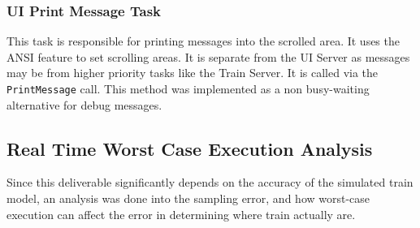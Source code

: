 \documentclass[letterpaper]{article}
\begin{document}
\subsubsection{UI Print Message Task%
  \label{ui-print-message-task}%
}

This task is responsible for printing messages into the scrolled area. It uses the ANSI feature to set scrolling areas. It is separate from the UI Server as messages may be from higher priority tasks like the Train Server. It is called via the \texttt{PrintMessage} call.  This method was implemented as a non busy-waiting alternative for debug messages.


\subsection{Real Time Worst Case Execution Analysis%
  \label{real-time-worst-case-execution-analysis}%
}

Since this deliverable significantly depends on the accuracy of the simulated train model, an analysis was done into the sampling error, and how worst-case execution can affect the error in determining where train actually are.
\end{document}
